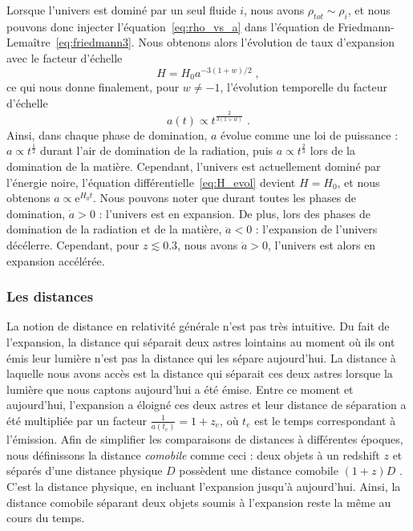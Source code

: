 \documentclass[11pt, twoside, a4paper, openright]{report}
\begin{document}
Lorsque l'univers est dominé par un seul fluide $i$, nous avons $\rho_{tot} \sim \rho_{i}$, et nous pouvons donc injecter l'équation~\ref{eq:rho_vs_a} dans l'équation de Friedmann-Lemaître~\ref{eq:friedmann3}. Nous obtenons alors l'évolution de taux d'expansion avec le facteur d'échelle
\begin{equation}
  \label{eq:H_evol}
  H = H_0 a^{-3 (1+w) / 2}  \; ,
\end{equation}
ce qui nous donne finalement, pour $w \neq -1$, l'évolution temporelle du facteur d'échelle
\begin{equation}
  \label{eq:a_vs_t}
  a(t) \propto t^{\frac{2}{3(1+w)}}  \; .
\end{equation}
Ainsi, dans chaque phase de domination, $a$ évolue comme une loi de puissance : $a \propto t^{\frac{1}{2}}$ durant l'air de domination de la radiation, puis $a \propto t^{\frac{2}{3}}$ lors de la domination de la matière. Cependant, l'univers est actuellement dominé par l'énergie noire, l'équation différentielle~\ref{eq:H_evol} devient $H = H_0$, et nous obtenons $a \propto \mathrm{e}^{H_{0} t}$. Nous pouvons noter que durant toutes les phases de domination, $\dot a > 0$ : l'univers est en expansion. De plus, lors des phases de domination de la radiation et de la matière, $\ddot a < 0$ : l'expansion de l'univers décélerre. Cependant, pour $ z \lesssim \num{0.3}$, nous avons $\ddot a > 0$, l'univers est alors en expansion accélérée.

\subsubsection{Les distances}
La notion de distance en relativité générale n'est pas très intuitive.
Du fait de l'expansion, la distance qui séparait deux astres lointains au moment où ils ont émis leur lumière n'est pas la distance qui les sépare aujourd'hui.
La distance à laquelle nous avons accès est la distance qui séparait ces deux astres lorsque la lumière que nous captons aujourd'hui a été émise. Entre ce moment et aujourd'hui, l'expansion a éloigné ces deux astres et leur distance de séparation a été multipliée par un facteur $\frac{1}{a(t_e)} = 1 + z_{e}$, où $t_e$ est le temps correspondant à l'émission.
Afin de simplifier les comparaisons de distances à différentes époques, nous définissons la distance \emph{comobile} comme ceci : deux objets à un redshift $z$ et séparés d'une distance physique $D$ possèdent une distance comobile $(1+z)D$ . C'est la distance physique, en incluant l'expansion jusqu'à aujourd'hui. Ainsi, la distance comobile séparant deux objets soumis à l'expansion reste la même au cours du temps.
\end{document}
